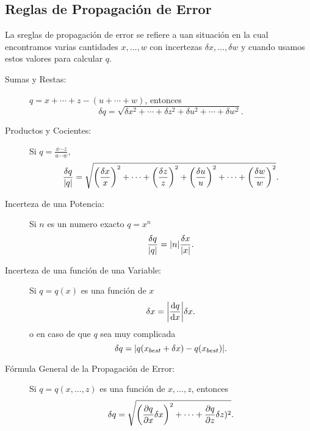 \subsection{Reglas de Propagación de Error}
La sreglas de propagación de error se refiere a uan situación en la cual encontramos varias cantidades $x,\ldots,w$ con incertezas $\delta x, \ldots ,\delta w$ y cuando usamos estos valores para calcular $q$. 
\begin{tcolorbox}
	\begin{description}
		\item[Sumas y Restas: ] $q = x + \cdots + z - (u + \cdots + w)$, entonces
			\begin{equation}
				\delta q = \sqrt{\delta x ^2 + \cdots + \delta z ^2 + \delta u ^2 + \cdots + \delta w^2}.
			\end{equation}
		\item[Productos y Cocientes: ] Si $q = \frac{x\cdots z}{u \cdots w},$
			\begin{equation}
				\frac{\delta q}{\abs{q}} = \sqrt{\qty(\frac{\delta x}{x})^2 + \cdots + \qty(\frac{\delta z}{z})^2 + \qty(\frac{\delta u}{u})^2 + \cdots + \qty(\frac{\delta w}{w})^2}.
			\end{equation}
		\item[Incerteza de una Potencia: ] Si $n$ es un numero exacto $q = x^n$
			\begin{equation}
				\frac{\delta q}{\abs{q}} = \abs{n} \frac{\delta x}{\abs{x}}.
			\end{equation}
		\item[Incerteza de una función de una Variable: ] Si $q = q(x)$ es una función de $x$
			\begin{equation}
				\delta x = \abs{\dv{q}{x}} \delta x.
			\end{equation}
		o en caso de que $q$ sea muy complicada
			\begin{equation}
				\delta q = \abs{q(x_{best} + \delta x) - q(x_{best})}.
			\end{equation}
		\item[Fórmula General de la Propagación de Error: ] Si $q = q(x,\ldots ,z)$ es una función de $x,\ldots ,z$, entonces
			\begin{equation}
				\delta q = \sqrt{\qty(\pdv{q}{x} \delta x)^2 + \cdots + \pdv{q}{z} \delta z)^2}.
			\end{equation}
	\end{description}
\end{tcolorbox}







